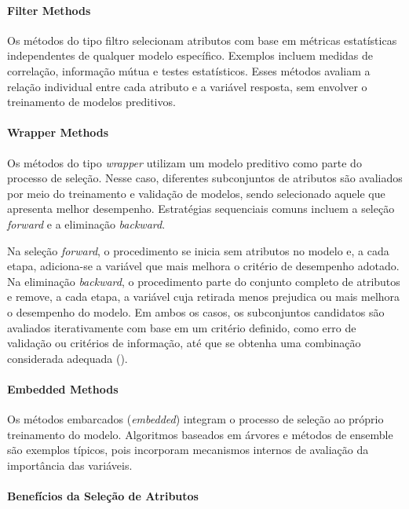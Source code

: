\paragraph{Filter Methods}

Os métodos do tipo filtro selecionam atributos com base em métricas estatísticas independentes de qualquer modelo específico. Exemplos incluem medidas de correlação, informação mútua e testes estatísticos. Esses métodos avaliam a relação individual entre cada atributo e a variável resposta, sem envolver o treinamento de modelos preditivos.

\paragraph{Wrapper Methods}

Os métodos do tipo \textit{wrapper} utilizam um modelo preditivo como parte do processo de seleção. Nesse caso, diferentes subconjuntos de atributos são avaliados por meio do treinamento e validação de modelos, sendo selecionado aquele que apresenta melhor desempenho. Estratégias sequenciais comuns incluem a seleção \textit{forward} e a eliminação \textit{backward}. 

Na seleção \textit{forward}, o procedimento se inicia sem atributos no modelo e, a cada etapa, adiciona-se a variável que mais melhora o critério de desempenho adotado. Na eliminação \textit{backward}, o procedimento parte do conjunto completo de atributos e remove, a cada etapa, a variável cuja retirada menos prejudica ou mais melhora o desempenho do modelo. Em ambos os casos, os subconjuntos candidatos são avaliados iterativamente com base em um critério definido, como erro de validação ou critérios de informação, até que se obtenha uma combinação considerada adequada (\cite{Hastie2009ESL}).


\paragraph{Embedded Methods}

Os métodos embarcados (\textit{embedded}) integram o processo de seleção ao próprio treinamento do modelo. Algoritmos baseados em árvores e métodos de ensemble são exemplos típicos, pois incorporam mecanismos internos de avaliação da importância das variáveis.

\paragraph{Benefícios da Seleção de Atributos}


